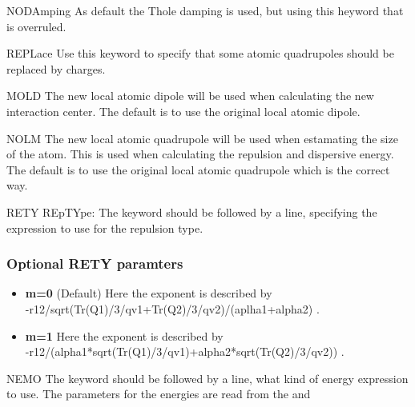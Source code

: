 \begin{keywordlist}
\item[NODAmping]
As default the Thole damping is used, but using this heyword that is overruled.
\item[REPLace]
Use this keyword to specify that some atomic quadrupoles should be replaced by charges.
\item[MOLD]
The new local atomic dipole will be used when calculating the new interaction center.
The default is to use the original local atomic dipole.
\item[NOLM]
The new local atomic quadrupole will be used when estamating the size of the atom.
This is used when calculating the repulsion and dispersive energy.
The default is to use the original local atomic quadrupole which is the correct way.
\item[RETY]
REpTYpe: The keyword should be followed by a line, specifying the expression to use for the repulsion type.
\subsubsection{Optional RETY paramters}
\begin{itemize}
\itemsep 9pt plus 3pt minus 3pt
\item
{\bf m=0}
(Default) Here the exponent is described by \\-r12/sqrt(Tr(Q1)/3/qv1+Tr(Q2)/3/qv2)/(aplha1+alpha2) .
\item
{\bf m=1}
Here the exponent is described by \\-r12/(alpha1*sqrt(Tr(Q1)/3/qv1)+alpha2*sqrt(Tr(Q2)/3/qv2)) .
\end{itemize}
\item[NEMO]
The keyword should be followed by a line, what kind of energy expression to use.
The parameters for the energies are read from the  and 

\end{keywordlist}
